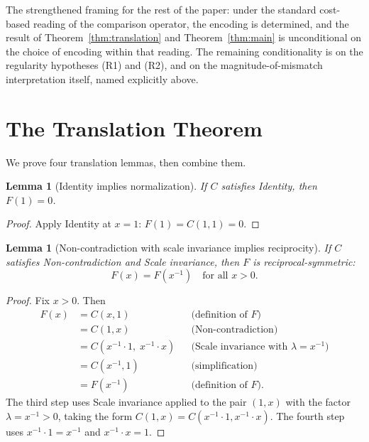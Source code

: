 \documentclass[11pt,a4paper]{article}
\newtheorem{lemma}[theorem]{Lemma}
\theoremstyle{definition}
\theoremstyle{remark}
\begin{document}
The strengthened framing for the rest of the paper: under the standard
cost-based reading of the comparison operator, the encoding is
determined, and the result of Theorem~\ref{thm:translation} and
Theorem~\ref{thm:main} is unconditional on the choice of encoding
within that reading. The remaining conditionality is on the regularity
hypotheses (R1) and (R2), and on the magnitude-of-mismatch
interpretation itself, named explicitly above.

\section{The Translation Theorem}\label{sec:translation}

We prove four translation lemmas, then combine them.

\begin{lemma}[Identity implies normalization]
\label{lem:identity-normalization}
If $C$ satisfies Identity, then $F(1) = 0$.
\end{lemma}

\begin{proof}
Apply Identity at $x = 1$: $F(1) = C(1, 1) = 0$.
\end{proof}

\begin{lemma}[Non-contradiction with scale invariance implies reciprocity]
\label{lem:reciprocity}
If $C$ satisfies Non-contradiction and Scale invariance, then $F$ is
reciprocal-symmetric:
\[
F(x) = F(x^{-1}) \quad \text{for all } x > 0.
\]
\end{lemma}

\begin{proof}
Fix $x > 0$. Then
\begin{align*}
F(x)
  &= C(x, 1) && \text{(definition of $F$)}\\
  &= C(1, x) && \text{(Non-contradiction)}\\
  &= C(x^{-1} \cdot 1, \; x^{-1} \cdot x)
                          && \text{(Scale invariance with $\lambda = x^{-1}$)}\\
  &= C(x^{-1}, 1) && \text{(simplification)}\\
  &= F(x^{-1}) && \text{(definition of $F$)}.
\end{align*}
The third step uses Scale invariance applied to the pair $(1, x)$ with the
factor $\lambda = x^{-1} > 0$, taking the form $C(1, x) = C(x^{-1} \cdot 1,
x^{-1} \cdot x)$. The fourth step uses $x^{-1} \cdot 1 = x^{-1}$ and
$x^{-1} \cdot x = 1$.
\end{proof}
\end{document}

